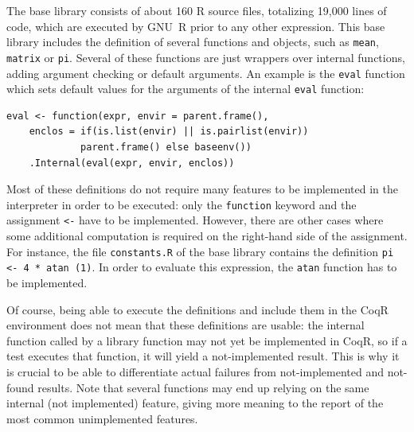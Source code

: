 \documentclass[
    sigplan,
    10pt,
    review, %
    natbib=false %
 ]{acmart}
\newcommand\et[1]{\todo[color=blue!20,size=\scriptsize]{#1}}
\newcommand\CoqR{CoqR}
\begin{document}
The base library consists of about 160 R source files, totalizing 19,000 lines of code, which are executed by GNU~R prior to any other
expression. This base library includes the definition of several
functions and objects, such as \texttt{mean}, \texttt{matrix} or \texttt{pi}.
Several of these functions are just wrappers over internal functions, adding  argument checking or default arguments. An example is the \texttt{eval} function which sets default values for the arguments of the internal \texttt{eval} function:
\begin{verbatim}
eval <- function(expr, envir = parent.frame(),
    enclos = if(is.list(envir) || is.pairlist(envir))
             parent.frame() else baseenv())
    .Internal(eval(expr, envir, enclos))
\end{verbatim}

Most of these definitions do not require many features to be implemented in the interpreter in order to be executed: only
the \texttt{function} keyword and the assignment \texttt{<-} have
to be implemented.
However, there are other cases where some additional computation
is required on the right-hand side of the assignment.
For instance, the file \texttt{constants.R}
of the base library contains the definition \texttt{pi <- 4 * atan (1)}.
In order to evaluate this expression, the \texttt{atan} function has to be implemented.


Of course, being able to execute the definitions and include
them in the \CoqR{} environment does not mean that these definitions are usable: the internal function called by a library function may not yet be implemented in \CoqR, so if a test executes that function, it will yield a not-implemented result. This is why it is crucial to be able to differentiate actual failures from not-implemented and not-found results. Note that several functions may end up relying on the same internal (not implemented) feature, giving more meaning to the report of the most common unimplemented features.
\end{document}
